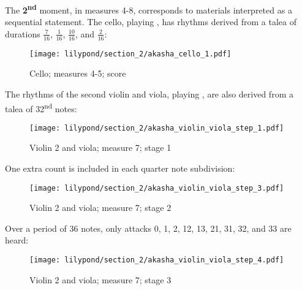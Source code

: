 The \textbf{2\textsuperscript{nd}} moment, in measures 4-8, corresponds to materials  interpreted as a sequential statement. The cello, playing , has rhythms derived from a talea of durations $\frac{7}{16}$, $\frac{1}{16}$, $\frac{10}{16}$, and $\frac{2}{16}$:

\begin{figure}[H]
    \texttt{[image: lilypond/section\_2/akasha\_cello\_1.pdf]}
    \caption{Cello; measures 4-5; score}
    \label{fig:cello-talea}
\end{figure}

The rhythms of the second violin and viola, playing , are also derived from a talea of 32\textsuperscript{nd} notes:

\setcounter{figure}{7}
\setcounter{subFigure}{1}
\renewcommand{\thefigure}{\thechapter.\arabic{figure}.\alph{subFigure}}
\begin{figure}[H]
    \texttt{[image: lilypond/section\_2/akasha\_violin\_viola\_step\_1.pdf]}
    \caption{Violin 2 and viola; measure 7; stage 1}
    \label{fig:violin-viola-talea-1}
\end{figure}

One extra count is included in each quarter note subdivision:



\setcounter{figure}{7}
\setcounter{subFigure}{2}
\begin{figure}[H]
    \texttt{[image: lilypond/section\_2/akasha\_violin\_viola\_step\_3.pdf]}
    \caption{Violin 2 and viola; measure 7; stage 2}
    \label{fig:violin-viola-talea-3}
\end{figure}

Over a period of 36 notes, only attacks 0, 1, 2, 12, 13, 21, 31, 32, and 33 are heard:

\setcounter{figure}{7}
\setcounter{subFigure}{3}
\begin{figure}[H]
    \texttt{[image: lilypond/section\_2/akasha\_violin\_viola\_step\_4.pdf]}
    \caption{Violin 2 and viola; measure 7; stage 3}
    \label{fig:violin-viola-talea-4}
\end{figure}


